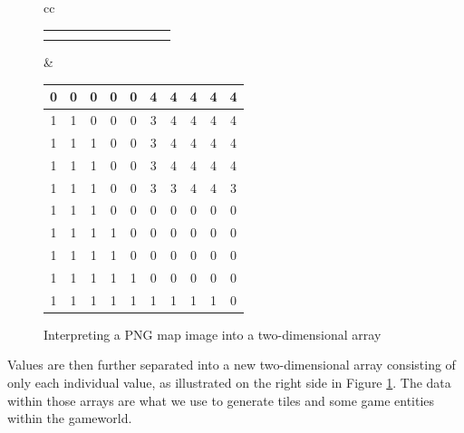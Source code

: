 \begin{figure}[H]
\begin{tabular}{cc}
{\begin{tabular}{|c|c|c|c|c|c|c|c|c|c|}
                \cellcolor{black} & \cellcolor{black} & \cellcolor{black} &
                \cellcolor{black} \\ \hline
                \cellcolor{green} & \cellcolor{green} & \cellcolor{green} &
                \cellcolor{green} & \cellcolor{green} & \cellcolor{black} &
                \cellcolor{black} & \cellcolor{black} & \cellcolor{black} &
                \cellcolor{black} \\ \hline
                \cellcolor{green} & \cellcolor{green} & \cellcolor{green} &
                \cellcolor{green} & \cellcolor{green} & \cellcolor{green} &
                \cellcolor{green} & \cellcolor{green} & \cellcolor{green} &
                \cellcolor{black} \\ \hline
            \end{tabular}
        }
        &
        {\footnotesize
            \setlength{\tabcolsep}{2.5pt}
            \begin{tabular}{|c|c|c|c|c|c|c|c|c|c|}
                \hline
                0 & 0 & 0 & 0 & 0 & 4 & 4 & 4 & 4 & 4 \\ \hline
                1 & 1 & 0 & 0 & 0 & 3 & 4 & 4 & 4 & 4 \\ \hline
                1 & 1 & 1 & 0 & 0 & 3 & 4 & 4 & 4 & 4 \\ \hline
                1 & 1 & 1 & 0 & 0 & 3 & 4 & 4 & 4 & 4 \\ \hline
                1 & 1 & 1 & 0 & 0 & 3 & 3 & 4 & 4 & 3 \\ \hline
                1 & 1 & 1 & 0 & 0 & 0 & 0 & 0 & 0 & 0 \\ \hline
                1 & 1 & 1 & 1 & 0 & 0 & 0 & 0 & 0 & 0 \\ \hline
                1 & 1 & 1 & 1 & 0 & 0 & 0 & 0 & 0 & 0 \\ \hline
                1 & 1 & 1 & 1 & 1 & 0 & 0 & 0 & 0 & 0 \\ \hline
                1 & 1 & 1 & 1 & 1 & 1 & 1 & 1 & 1 & 0 \\ \hline
            \end{tabular}
        }
    \end{tabular}
    \caption{Interpreting a PNG map image into a two-dimensional array}\label{fig:png_to_array} 
\end{figure}
Values are then further separated into a new two-dimensional array consisting of only each individual value, as illustrated on the right side in Figure \ref{fig:png_to_array}.
The data within those arrays are what we use to generate tiles and some game entities within the gameworld.

